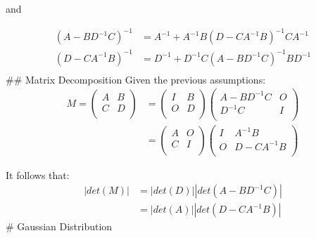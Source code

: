 \documentclass[
]{article}
\begin{document}
and

\[
\begin{equation*}
    \begin{aligned}
        (A - BD^{-1}C)^{-1} &= A^{-1} + A^{-1}B(D - CA^{-1}B)^{-1}CA^{-1} \\
        (D - CA^{-1}B)^{-1} &= D^{-1} + D^{-1}C(A - BD^{-1}C)^{-1}BD^{-1} \\
    \end{aligned}
\end{equation*}
\] \#\# Matrix Decomposition Given the previous assumptions: \[
\begin{equation*}
    \begin{aligned} M = 
        \begin{pmatrix}
            A & B \\ 
            C & D \\ 
        \end{pmatrix} &= 
        \begin{pmatrix}
            I & B \\ 
            O & D \\ 
        \end{pmatrix} \begin{pmatrix}
            A - BD^{-1}C & O \\ 
            D^{-1}C & I \\             
        \end{pmatrix} \\
        &= \begin{pmatrix}
            A & O \\ 
            C & I \\ 
        \end{pmatrix} \begin{pmatrix}
            I & A^{-1}B \\ 
            O & D - CA^{-1}B \\             
        \end{pmatrix} 
    \end{aligned}
\end{equation*}
\]

It follows that: \[
\begin{equation*}
    \begin{aligned}
    |det(M)|  &= |det(D)||det(A - BD^{-1}C)| \\
                &= |det(A)||det(D - CA^{-1}B)|
    \end{aligned}
\end{equation*}
\] \# Gaussian Distribution
\end{document}

